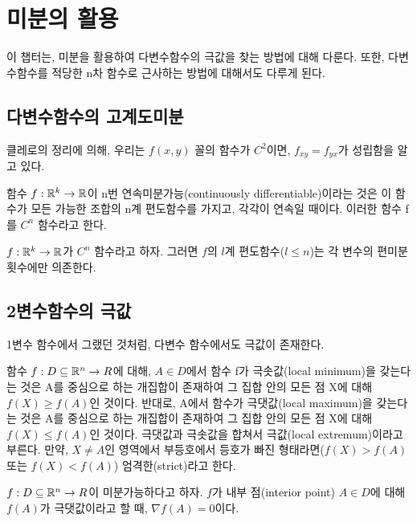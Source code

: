 \section{미분의 활용}
이 챕터는, 미분을 활용하여 다변수함수의 극값을 찾는 방법에 대해 다룬다. 또한, 다변수함수를 적당한 n차 함수로 근사하는 방법에 대해서도 다루게 된다.

\subsection{다변수함수의 고계도미분}
클레로의 정리에 의해, 우리는 $f(x,y)$ 꼴의 함수가 $C^2$이면, $f_{xy} = f_{yx}$가 성립함을 알고 있다.

\begin{definition}[n번 연속미분]
함수 $f: \mathbb{R}^k \to \mathbb{R}$이 n번 연속미분가능(continuously differentiable)이라는 것은 이 함수가 모든 가능한 조합의 n계 편도함수를 가지고, 각각이 연속일 때이다. 이러한 함수 f를 $C^n$ 함수라고 한다.
\end{definition}

\begin{theorem}
$f: \mathbb{R}^k \to \mathbb{R}$가 $C^n$ 함수라고 하자. 그러면 $f$의 $l$계 편도함수($l \leq n$)는 각 변수의 편미분 횟수에만 의존한다.
\end{theorem}

\subsection{2변수함수의 극값}

1변수 함수에서 그랬던 것처럼, 다변수 함수에서도 극값이 존재한다.

\begin{definition}[극값]
함수 $f: D \subseteq \mathbb{R}^n \to R$에 대해, $A \in D$에서 함수 f가 극솟값(local minimum)을 갖는다는 것은 A를 중심으로 하는 개집합이 존재하여 그 집합 안의 모든 점 X에 대해 $f(X) \geq f(A)$인 것이다. 반대로, A에서 함수가 극댓값(local maximum)을 갖는다는 것은 A를 중심으로 하는 개집합이 존재하여 그 집합 안의 모든 점 X에 대해 $f(X) \leq f(A)$인 것이다. 극댓값과 극솟값을 합쳐서 극값(local extremum)이라고 부른다. 만약, $X \neq A$인 영역에서 부등호에서 등호가 빠진 형태라면($f(X) > f(A)$ 또는 $f(X) < f(A)$) 엄격한(strict)라고 한다.
\end{definition}

\begin{theorem}
$f: D \subseteq \mathbb{R}^n \to R$이 미분가능하다고 하자. $f$가 내부 점(interior point) $A \in D$에 대해 $f(A)$가 극댓값이라고 할 때, $\nabla f(A)=0$이다.
\end{theorem}

